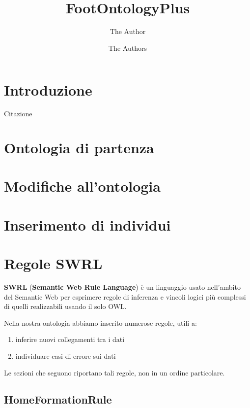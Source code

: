 \documentclass[11pt]{report} %
\title{FootOntologyPlus}
\author{The Author}
\author{The Authors}
\date{} %
\begin{document}
\maketitle

\newpage

\renewcommand*\contentsname{Indice}

\tableofcontents
\newpage

\chapter{Introduzione}

Citazione \cite{test}

\chapter{Ontologia di partenza}

\chapter{Modifiche all'ontologia}

\chapter{Inserimento di individui}

\chapter{Regole SWRL}

\textbf{SWRL} (\textbf{Semantic Web Rule Language}) è un linguaggio usato nell'ambito del Semantic Web per esprimere regole di inferenza e vincoli logici più complessi di quelli realizzabili usando il solo OWL.

\hfill

Nella nostra ontologia abbiamo inserito numerose regole, utili a:

\begin{enumerate}
    \item inferire nuovi collegamenti tra i dati
    \item individuare casi di errore sui dati
\end{enumerate}

Le sezioni che seguono riportano tali regole, non in un ordine particolare.

\section{HomeFormationRule}
\end{document}
